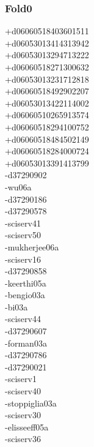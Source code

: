 \begin{multicols}{3}
\subsubsection*{Fold0}
+d06060518403601511\\
+d06053013414313942\\
+d06053013294713222\\
+d06060518271300632\\
+d06053013231712818\\
+d06060518492902207\\
+d06053013422114002\\
+d06060510265913574\\
+d06060518294100752\\
+d06060518484502149\\
+d06060518284000724\\
+d06053013391413799\\
-d37290902\\
-wu06a\\
-d37290186\\
-d37290578\\
-sciserv41\\
-sciserv50\\
-mukherjee06a\\
-sciserv16\\
-d37290858\\
-keerthi05a\\
-bengio03a\\
-bi03a\\
-sciserv44\\
-d37290607\\
-forman03a\\
-d37290786\\
-d37290021\\
-sciserv1\\
-sciserv40\\
-stoppiglia03a\\
-sciserv30\\
-elisseeff05a\\
-sciserv36\\

\end{multicols}
